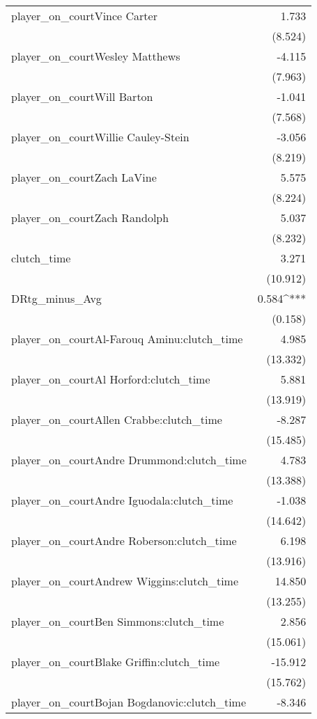 \documentclass[
  landscape]{article}
\begin{document}
\begin{table}[!htbp]
\begin{tabular}{@{\extracolsep{5pt}}lD{.}{.}{-3} }
  player\_on\_courtVince Carter & 1.733 \\ 
  & (8.524) \\ 
  player\_on\_courtWesley Matthews & -4.115 \\ 
  & (7.963) \\ 
  player\_on\_courtWill Barton & -1.041 \\ 
  & (7.568) \\ 
  player\_on\_courtWillie Cauley-Stein & -3.056 \\ 
  & (8.219) \\ 
  player\_on\_courtZach LaVine & 5.575 \\ 
  & (8.224) \\ 
  player\_on\_courtZach Randolph & 5.037 \\ 
  & (8.232) \\ 
  clutch\_time & 3.271 \\ 
  & (10.912) \\ 
  DRtg\_minus\_Avg & 0.584^{***} \\ 
  & (0.158) \\ 
  player\_on\_courtAl-Farouq Aminu:clutch\_time & 4.985 \\ 
  & (13.332) \\ 
  player\_on\_courtAl Horford:clutch\_time & 5.881 \\ 
  & (13.919) \\ 
  player\_on\_courtAllen Crabbe:clutch\_time & -8.287 \\ 
  & (15.485) \\ 
  player\_on\_courtAndre Drummond:clutch\_time & 4.783 \\ 
  & (13.388) \\ 
  player\_on\_courtAndre Iguodala:clutch\_time & -1.038 \\ 
  & (14.642) \\ 
  player\_on\_courtAndre Roberson:clutch\_time & 6.198 \\ 
  & (13.916) \\ 
  player\_on\_courtAndrew Wiggins:clutch\_time & 14.850 \\ 
  & (13.255) \\ 
  player\_on\_courtBen Simmons:clutch\_time & 2.856 \\ 
  & (15.061) \\ 
  player\_on\_courtBlake Griffin:clutch\_time & -15.912 \\ 
  & (15.762) \\ 
  player\_on\_courtBojan Bogdanovic:clutch\_time & -8.346 \\ 

\end{tabular}
\end{table}
\end{document}
